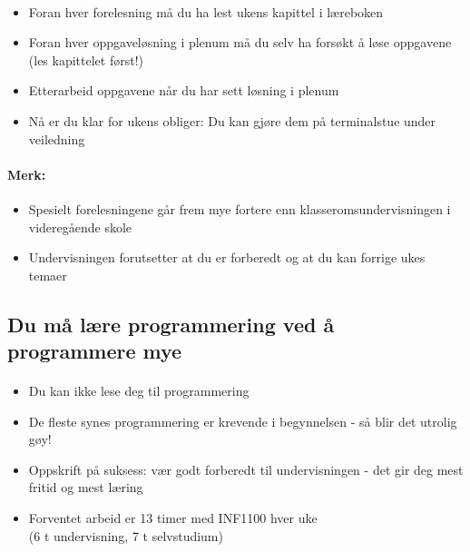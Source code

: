 \documentclass[%
oneside,                 %
final,                   %
10pt]{article}
\begin{document}

\paragraph{}
\begin{itemize}
  \item Foran hver forelesning må du ha lest ukens kapittel i læreboken

  \item Foran hver oppgaveløsning i plenum må du selv ha forsøkt å løse oppgavene (les kapittelet først!)

  \item Etterarbeid oppgavene når du har sett løsning i plenum

  \item Nå er du klar for ukens obliger: Du kan gjøre dem på terminalstue
    under veiledning
\end{itemize}

\noindent




\paragraph{Merk:}
\begin{itemize}
  \item Spesielt forelesningene går frem mye fortere enn klasseromsundervisningen i videregående skole

  \item Undervisningen forutsetter at du er forberedt og at du kan forrige ukes temaer
\end{itemize}

\noindent



\subsection*{Du må lære programmering ved å programmere mye}


\paragraph{}
\begin{itemize}
  \item Du kan ikke lese deg til programmering

  \item De fleste synes programmering er krevende i begynnelsen - så blir det utrolig gøy!

  \item Oppskrift på suksess: vær godt forberedt til undervisningen - det gir deg mest fritid og mest læring

  \item Forventet arbeid er 13 timer med INF1100 hver uke \\
    (6 t undervisning, 7 t selvstudium)
\end{itemize}
\end{document}
